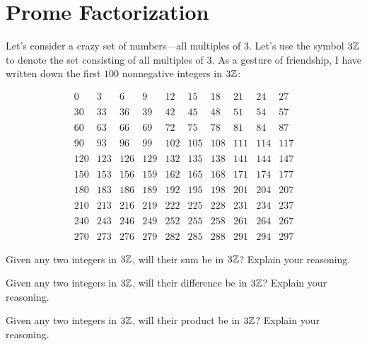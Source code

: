 \newpage
\section{Prome Factorization}\label{A:Prome}

Let's consider a crazy set of numbers---all multiples of $3$. Let's
use the symbol $3\mathbb Z$ to denote the set consisting of all multiples of
$3$. As a gesture of friendship, I have written down the first $100$
nonnegative integers in $3\mathbb Z$:

\[
\begin{array}{cccccccccc}
0   & 3   & 6   & 9   & 12  & 15  & 18  & 21  & 24  & 27  \\
\\
30  & 33  & 36  & 39  & 42  & 45  & 48  & 51  & 54  & 57  \\
\\
60  & 63  & 66  & 69  & 72  & 75  & 78  & 81  & 84  & 87  \\
\\
90  & 93  & 96  & 99  & 102 & 105 & 108 & 111 & 114 & 117 \\
\\
120 & 123 & 126 & 129 & 132 & 135 & 138 & 141 & 144 & 147 \\
\\
150 & 153 & 156 & 159 & 162 & 165 & 168 & 171 & 174 & 177 \\
\\
180 & 183 & 186 & 189 & 192 & 195 & 198 & 201 & 204 & 207 \\
\\
210 & 213 & 216 & 219 & 222 & 225 & 228 & 231 & 234 & 237 \\
\\
240 & 243 & 246 & 249 & 252 & 255 & 258 & 261 & 264 & 267 \\
\\
270 & 273 & 276 & 279 & 282 & 285 & 288 & 291 & 294 & 297
\end{array}
\]



\begin{prob}
Given any two integers in $3\mathbb Z$, will their sum be in $3\mathbb Z$? Explain
your reasoning.
\end{prob}

\begin{prob}
Given any two integers in $3\mathbb Z$, will their difference be in $3\mathbb Z$?
Explain your reasoning.
\end{prob}

\begin{prob}
Given any two integers in $3\mathbb Z$, will their product be in $3\mathbb Z$?
Explain your reasoning.
\end{prob}


